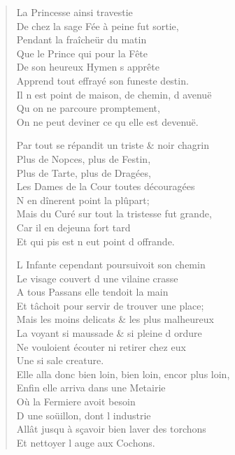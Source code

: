 \documentclass[14pt,a4paper]{memoir}
\begin{document}
{{\begin{otherlanguage}{french}
\begin{verse}
\vin La Princesse ainsi travestie \\
De chez la sage Fée à peine fut sortie, \\
\vin Pendant la fraîcheür du matin \\
\vin Que le Prince qui pour la Fête \\
\vin De son heureux Hymen s\textquotesingle{} apprête \\
Apprend tout effrayé son funeste destin. \\
Il n\textquotesingle{} est point de maison, de chemin, d\textquotesingle{} avenuë \\
\vin Qu\textquotesingle{} on ne parcoure promptement, \\
On ne peut deviner ce qu\textquotesingle{} elle est devenuë.

Par tout se répandit un triste \& noir chagrin \\
\vin Plus de Nopces, plus de Festin, \\
\vin Plus de Tarte, plus de Dragées, \\
Les Dames de la Cour toutes découragées \\
\vin N\textquotesingle{} en dînerent point la plûpart; \\
Mais du Curé sur tout la tristesse fut grande, \\
\vin Car il en dejeuna fort tard \\
\vin Et qui pis est n\textquotesingle{} eut point d\textquotesingle{} offrande.

L\textquotesingle{} Infante cependant poursuivoit son chemin \\
Le visage couvert d\textquotesingle{} une vilaine crasse \\
\vin A tous Passans elle tendoit la main \\
Et tâchoit pour servir de trouver une place; \\
Mais les moins delicats \& les plus malheureux \\
La voyant si maussade \& si pleine d\textquotesingle{} ordure \\
Ne vouloient écouter ni retirer chez eux \\
\vin Une si sale creature. \\
Elle alla donc bien loin, bien loin, encor plus loin, \\
Enfin elle arriva dans une Metairie \\
\vin Où la Fermiere avoit besoin \\
\vin D\textquotesingle{} une soüillon, dont l\textquotesingle{} industrie \\
Allât jusqu\textquotesingle{} à sçavoir bien laver des torchons \\
\vin Et nettoyer l\textquotesingle{} auge aux Cochons.


\end{verse}
\end{otherlanguage}}}
\end{document}
